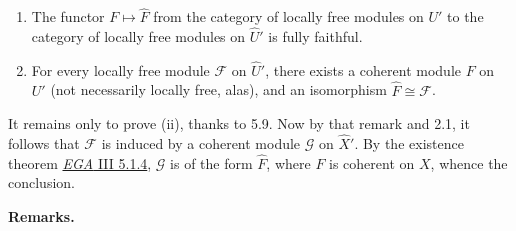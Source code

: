 \documentclass[
  11pt,
  a4paper,
]{book}
\providecommand{\tightlist}{%
  \setlength{\itemsep}{0pt}\setlength{\parskip}{0pt}}
\begin{document}
\begin{enumerate}
\def\labelenumi{\arabic{enumi}.}
\tightlist
\item
  The functor \(F \mapsto \hat{F}\) from the category of locally free
  modules on \(U'\) to the category of locally free modules on
  \(\hat{U}'\) is fully faithful.
\item
  For every locally free module \(\mathcal{F}\) on \(\hat{U}'\), there
  exists a coherent module \(F\) on \(U'\) (not necessarily locally
  free, alas), and an isomorphism \(\hat{F} \cong \mathcal{F}\).
\end{enumerate}

It remains only to prove (ii), thanks to 5.9. Now by that remark and
2.1, it follows that \(\mathcal{F}\) is induced by a coherent module
\(\mathcal{G}\) on \(\hat{X}'\). By the existence theorem
\href{https://jcreinhold.github.io/ega/iii/12-ch3-05-existence-coherent-algebraic-sheaves.html\#51-statement-of-the-theorem}{\emph{EGA}
III 5.1.4}, \(\mathcal{G}\) is of the form \(\hat{F}\), where \(F\) is
coherent on \(X\), whence the conclusion.

\textbf{Remarks.}
\end{document}
